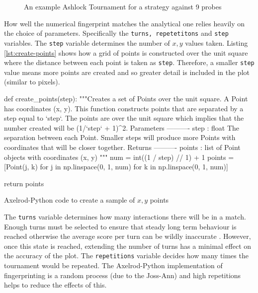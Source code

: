 \begin{figure}[!hbtp]
    \begin{center}
        
        \caption{An example Ashlock Tournament for a strategy against 9 probes}\label{fig:spatialtourn}
    \end{center}
\end{figure}


How well the numerical fingerprint matches the analytical one relies heavily on the choice of parameters.
Specifically the \texttt{turns, repetetitons} and \texttt{step} variables.
The \texttt{step} variable determines the number of $x,y$ values taken.
Listing \ref{lst:create-points} shows how a grid of points is constructed over the unit square where the distance between each point is taken as \texttt{step}.
Therefore, a smaller \texttt{step} value means more points are created and so greater detail is included in the plot (similar to pixels).

\begin{listing}[hbtp!]
\begin{SourceCode}
def create_points(step):
    """Creates a set of Points over the unit square.
    A Point has coordinates (x, y). This function constructs points that are
    separated by a step equal to `step`. The points are over the unit
    square which implies that the number created will be (1/`step` + 1)^2.
    Parameters
    ----------
    step : float
        The separation between each Point. Smaller steps will produce more
        Points with coordinates that will be closer together.
    Returns
    ----------
    points : list
        of Point objects with coordinates (x, y)
    """
    num = int((1 / step) // 1) + 1
    points = [Point(j, k) for j in np.linspace(0, 1, num)
              for k in np.linspace(0, 1, num)]

    return points
\end{SourceCode}
\caption{Axelrod-Python code to create a sample of $x,y$ points}
\label{lst:create-points}
\end{listing}

The \texttt{turns} variable determines how many interactions there will be in a match.
Enough turns must be selected to ensure that steady long term behaviour is reached otherwise the average score per turn can be wildly inaccurate \cite{Robinson2004}.
However, once this state is reached, extending the number of turns has a minimal effect on the accuracy of the plot.
The \texttt{repetitions} variable decides how many times the tournament would be repeated.
The Axelrod-Python implementation of fingerprinting is a random process (due to the Joss-Ann) and high repetitions helps to reduce the effects of this.

